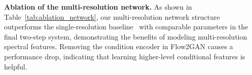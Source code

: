 \documentclass{article} %
\begin{document}
 \begin{table}[h!]
\centering
\caption{Comparison to Shortcut models on LibriTTS dev set with Mel-spectrogram conditioning.}
\vspace{-0.5em}
\label{tab:comp_shortcut}
\setlength{\tabcolsep}{6pt} %
\vspace{-0.5em}
\end{table}

\noindent\textbf{Ablation of the multi-resolution network.} As shown in Table~\ref{tab:ablation_network}, our multi-resolution network structure outperforms the single-resolution baseline~\citep{vocos} with comparable parameters in the final two-step system, demonstrating the benefits of modeling multi-resolution spectral features. 
Removing the condition encoder in Flow2GAN causes a performance drop, indicating that learning higher-level conditional features is helpful.

\end{document}
